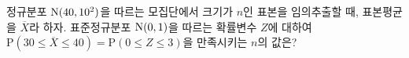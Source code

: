 정규분포 $\mathrm{N}(40{,}\mkern3mu\mathopen{}10^2)$을 따르는 모집단에서 크기가 $n$인 표본을 임의추출할 때, 표본평균을 $\overline{X}$라 하자. 표준정규분포 $\mathrm{N}(0{,}\mkern3mu\mathopen{}1)$을 따르는 확률변수 $Z$에 대하여 $\mathrm{P}(30\le\overline{X}\le 40)=\mathrm{P}(0\le Z\le 3)$을 만족시키는 $n$의 값은?
